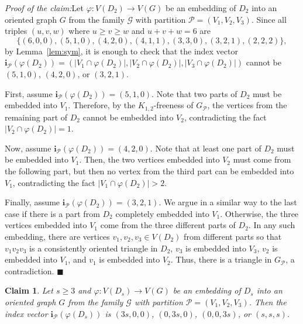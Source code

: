 \documentclass[11pt]{amsart}
\newtheorem{claim}[theorem]{Claim}
\newcommand{\CP}{\mathcal{P}}
\newcommand{\G}{\mathcal{G}}
\newenvironment{claimproof}[1]{\par\noindent\textit{Proof of the claim:}\space#1}{\leavevmode\unskip\penalty9999 \hbox{}\nobreak\hfill\quad\hbox{$\blacksquare$}}
\begin{document}
\begin{claimproof} 
    Let $\varphi: V(D_2) \to V(G)$ be an embedding of $D_2$ into an oriented graph $G$ from the family $\G$ with partition $\CP = (V_1,V_2,V_3)$. Since all triples $(u,v,w)$ where $u \ge v \ge w$ and $u+v+w=6$ are 
    $$\{ (6,0,0), (5,1,0), (4,2,0), (4,1,1), (3,3,0), (3,2,1), (2,2,2) \}, $$ 
    by Lemma~\ref{lem:sym}, it is enough to check that the index vector $\mathbf{i}_\CP(\varphi(D_2)) = (|V_1\cap \varphi(D_2)|, |V_2 \cap \varphi(D_2)|, |V_3 \cap \varphi(D_2)|)$ cannot be $(5,1,0)$, $(4,2,0)$, or $(3,2,1)$.

    First, assume $\mathbf{i}_\CP(\varphi(D_2)) = (5,1,0)$.
    Note that two parts of $D_2$ must be embedded into $V_1$. Therefore, by the $K_{1,2}$-freeness of $G_{\CP}$, the vertices from the remaining part of $D_2$ cannot be embedded into $V_2$, contradicting the fact $|V_2 \cap \varphi(D_2)| = 1$.

    Now, assume $\mathbf{i}_\CP(\varphi(D_2)) = (4,2,0)$. Note that at least one part of $D_2$ must be embedded into $V_1$. Then, the two vertices embedded into $V_2$ must come from the following part, but then no vertex from the third part can be embedded into $V_1$, contradicting the fact $|V_1 \cap \varphi(D_2)| > 2$.

    Finally, assume $\mathbf{i}_\CP(\varphi(D_2)) = (3,2,1)$. We argue in a similar way to the last case if there is a part from $D_2$ completely embedded into $V_1$. Otherwise, the three vertices embedded into $V_1$ come from the three different parts of $D_2$. In any such embedding, there are vertices $v_1, v_2, v_3 \in V(D_2)$ from different parts so that $v_1v_2v_3$ is a consistently oriented triangle in $D_2$, $v_3$ is embedded into $V_3$, $v_2$ is embedded into $V_1$, and $v_1$ is embedded into $V_2$. Thus, there is a triangle in $G_{\CP}$, a contradiction. 
\end{claimproof}

\begin{claim} \label{claim:int_pat_dr}
    Let $s\ge 3$ and $\varphi: V(D_s) \to V(G)$ be an embedding of $D_s$ into an oriented graph $G$ from the family $\G$ with partition $\CP = (V_1,V_2,V_3)$.
    Then the index vector $\mathbf{i}_\CP(\varphi(D_s))$ is $(3s,0,0)$, $(0,3s,0)$, $(0,0,3s)$, or $(s,s,s)$.
\end{claim}
\end{document}
